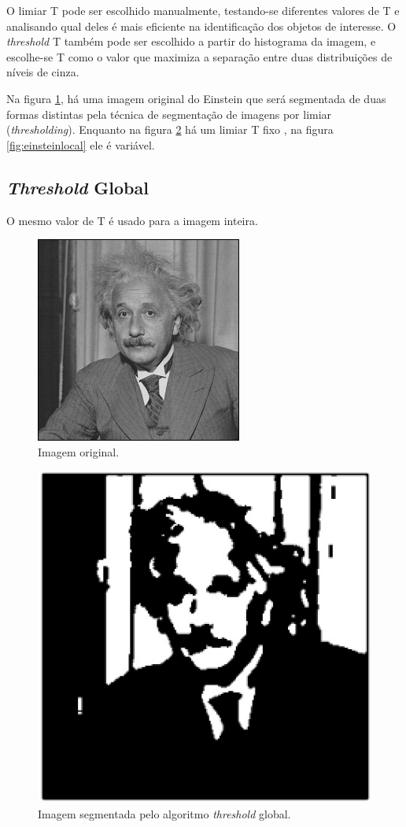 O limiar T pode ser escolhido manualmente, testando-se diferentes valores de T e analisando qual deles é mais eficiente na identificação dos objetos de interesse.
O \textit{threshold} T também pode ser escolhido a partir do histograma da imagem, e escolhe-se T como o valor que maximiza a separação entre duas distribuições de níveis de cinza.

Na figura \ref{fig:einstein}, há uma imagem original do Einstein que será segmentada de duas formas distintas pela técnica de segmentação de imagens por limiar (\textit{thresholding}). Enquanto na figura \ref{fig:einsteinglobal} há um limiar T fixo , na  figura \ref{fig:einsteinlocal} ele é variável.

\subsection{\textit{Threshold} Global}
O mesmo valor de T é usado para a imagem inteira.

  \begin{figure}[!htb]
       \begin{center}  
          \includegraphics[width=0.3\columnwidth]{img/einstein.jpg}
           \caption{\label{fig:einstein}Imagem original. \citep{stanford}}
       \end{center}
   \end{figure}

  \begin{figure}[!htb]
       \begin{center}  
          \includegraphics[width=0.3\columnwidth]{img/einstein-globalthresholding127.jpg}
           \caption{\label{fig:einsteinglobal}Imagem segmentada pelo algoritmo \textit{threshold} global.}
       \end{center}
   \end{figure}

